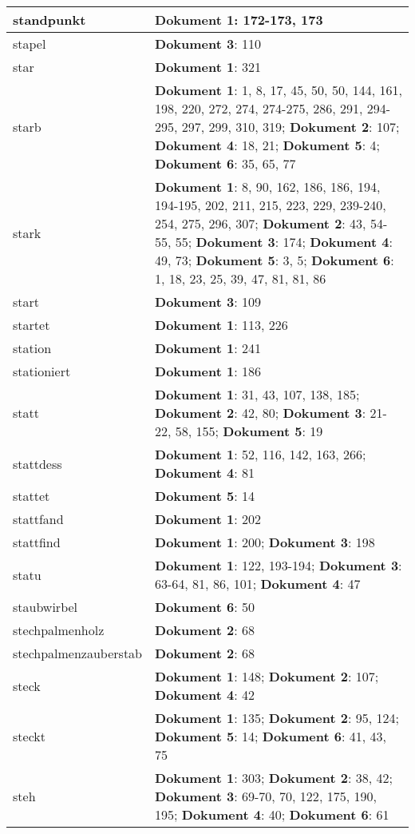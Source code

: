 \documentclass[a5paper]{article}
\begin{document}
\begin{longtable}[l]{|l|p{3in}|}
\hline
standpunkt & \textbf{Dokument 1}: 172-173, 173 \\
\hline
stapel & \textbf{Dokument 3}: 110 \\
\hline
star & \textbf{Dokument 1}: 321 \\
\hline
starb & \textbf{Dokument 1}: 1, 8, 17, 45, 50, 50, 144, 161, 198, 220, 272, 274, 274-275, 286, 291, 294-295, 297, 299, 310, 319; \textbf{Dokument 2}: 107; \textbf{Dokument 4}: 18, 21; \textbf{Dokument 5}: 4; \textbf{Dokument 6}: 35, 65, 77 \\
\hline
stark & \textbf{Dokument 1}: 8, 90, 162, 186, 186, 194, 194-195, 202, 211, 215, 223, 229, 239-240, 254, 275, 296, 307; \textbf{Dokument 2}: 43, 54-55, 55; \textbf{Dokument 3}: 174; \textbf{Dokument 4}: 49, 73; \textbf{Dokument 5}: 3, 5; \textbf{Dokument 6}: 1, 18, 23, 25, 39, 47, 81, 81, 86 \\
\hline
start & \textbf{Dokument 3}: 109 \\
\hline
startet & \textbf{Dokument 1}: 113, 226 \\
\hline
station & \textbf{Dokument 1}: 241 \\
\hline
stationiert & \textbf{Dokument 1}: 186 \\
\hline
statt & \textbf{Dokument 1}: 31, 43, 107, 138, 185; \textbf{Dokument 2}: 42, 80; \textbf{Dokument 3}: 21-22, 58, 155; \textbf{Dokument 5}: 19 \\
\hline
stattdess & \textbf{Dokument 1}: 52, 116, 142, 163, 266; \textbf{Dokument 4}: 81 \\
\hline
stattet & \textbf{Dokument 5}: 14 \\
\hline
stattfand & \textbf{Dokument 1}: 202 \\
\hline
stattfind & \textbf{Dokument 1}: 200; \textbf{Dokument 3}: 198 \\
\hline
statu & \textbf{Dokument 1}: 122, 193-194; \textbf{Dokument 3}: 63-64, 81, 86, 101; \textbf{Dokument 4}: 47 \\
\hline
staubwirbel & \textbf{Dokument 6}: 50 \\
\hline
stechpalmenholz & \textbf{Dokument 2}: 68 \\
\hline
stechpalmenzauberstab & \textbf{Dokument 2}: 68 \\
\hline
steck & \textbf{Dokument 1}: 148; \textbf{Dokument 2}: 107; \textbf{Dokument 4}: 42 \\
\hline
steckt & \textbf{Dokument 1}: 135; \textbf{Dokument 2}: 95, 124; \textbf{Dokument 5}: 14; \textbf{Dokument 6}: 41, 43, 75 \\
\hline
steh & \textbf{Dokument 1}: 303; \textbf{Dokument 2}: 38, 42; \textbf{Dokument 3}: 69-70, 70, 122, 175, 190, 195; \textbf{Dokument 4}: 40; \textbf{Dokument 6}: 61 \\

\end{longtable}
\end{document}
